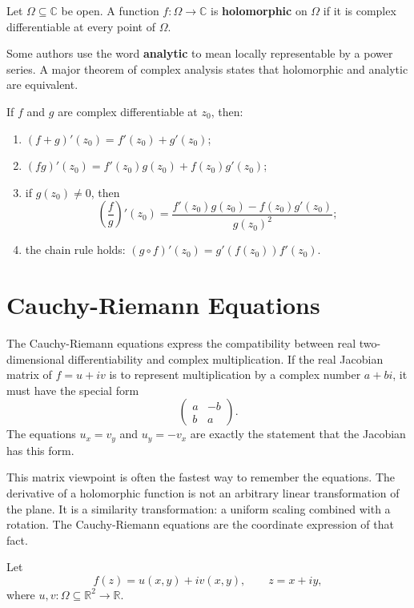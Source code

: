 \begin{definition}
Let $\Omega\subseteq\mathbb{C}$ be open. A function $f:\Omega\to\mathbb{C}$ is \textbf{holomorphic} on $\Omega$ if it is complex differentiable at every point of $\Omega$.
\end{definition}

Some authors use the word \textbf{analytic} to mean locally representable by a power series. A major theorem of complex analysis states that holomorphic and analytic are equivalent.

\begin{proposition}
If $f$ and $g$ are complex differentiable at $z_0$, then:
\begin{enumerate}
    \item $(f+g)'(z_0)=f'(z_0)+g'(z_0)$;
    \item $(fg)'(z_0)=f'(z_0)g(z_0)+f(z_0)g'(z_0)$;
    \item if $g(z_0)\neq 0$, then
    \[
        \left(\frac{f}{g}\right)'(z_0)=\frac{f'(z_0)g(z_0)-f(z_0)g'(z_0)}{g(z_0)^2};
    \]
    \item the chain rule holds: $(g\circ f)'(z_0)=g'(f(z_0))f'(z_0)$.
\end{enumerate}
\end{proposition}

\section{Cauchy-Riemann Equations}


The Cauchy-Riemann equations express the compatibility between real two-dimensional differentiability and complex multiplication. If the real Jacobian matrix of $f=u+iv$ is to represent multiplication by a complex number $a+bi$, it must have the special form
\[
    \begin{pmatrix}
        a & -b\\
        b & a
    \end{pmatrix}.
\]
The equations $u_x=v_y$ and $u_y=-v_x$ are exactly the statement that the Jacobian has this form.

This matrix viewpoint is often the fastest way to remember the equations. The derivative of a holomorphic function is not an arbitrary linear transformation of the plane. It is a similarity transformation: a uniform scaling combined with a rotation. The Cauchy-Riemann equations are the coordinate expression of that fact.

Let
\[
    f(z)=u(x,y)+iv(x,y),
    \qquad z=x+iy,
\]
where $u,v:\Omega\subseteq\mathbb{R}^2\to\mathbb{R}$.

